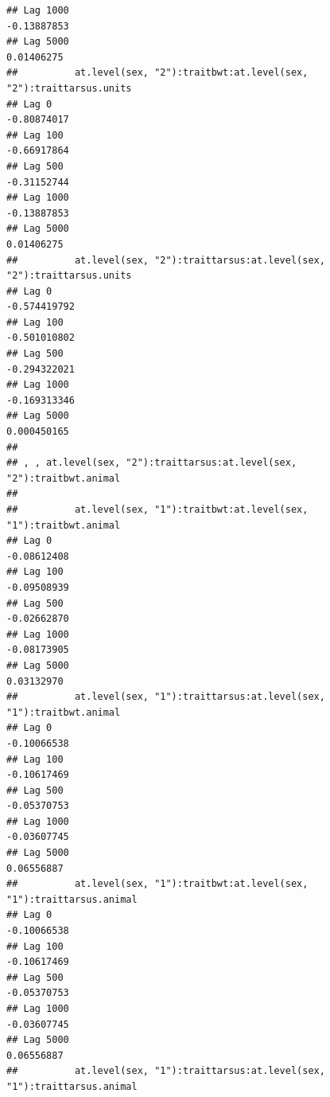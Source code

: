 \documentclass[
  12pt,
]{book}
\begin{document}
\begin{verbatim}
## Lag 1000                                                      -0.13887853
## Lag 5000                                                       0.01406275
##          at.level(sex, "2"):traitbwt:at.level(sex, "2"):traittarsus.units
## Lag 0                                                         -0.80874017
## Lag 100                                                       -0.66917864
## Lag 500                                                       -0.31152744
## Lag 1000                                                      -0.13887853
## Lag 5000                                                       0.01406275
##          at.level(sex, "2"):traittarsus:at.level(sex, "2"):traittarsus.units
## Lag 0                                                           -0.574419792
## Lag 100                                                         -0.501010802
## Lag 500                                                         -0.294322021
## Lag 1000                                                        -0.169313346
## Lag 5000                                                         0.000450165
## 
## , , at.level(sex, "2"):traittarsus:at.level(sex, "2"):traitbwt.animal
## 
##          at.level(sex, "1"):traitbwt:at.level(sex, "1"):traitbwt.animal
## Lag 0                                                       -0.08612408
## Lag 100                                                     -0.09508939
## Lag 500                                                     -0.02662870
## Lag 1000                                                    -0.08173905
## Lag 5000                                                     0.03132970
##          at.level(sex, "1"):traittarsus:at.level(sex, "1"):traitbwt.animal
## Lag 0                                                          -0.10066538
## Lag 100                                                        -0.10617469
## Lag 500                                                        -0.05370753
## Lag 1000                                                       -0.03607745
## Lag 5000                                                        0.06556887
##          at.level(sex, "1"):traitbwt:at.level(sex, "1"):traittarsus.animal
## Lag 0                                                          -0.10066538
## Lag 100                                                        -0.10617469
## Lag 500                                                        -0.05370753
## Lag 1000                                                       -0.03607745
## Lag 5000                                                        0.06556887
##          at.level(sex, "1"):traittarsus:at.level(sex, "1"):traittarsus.animal

\end{verbatim}
\end{document}
